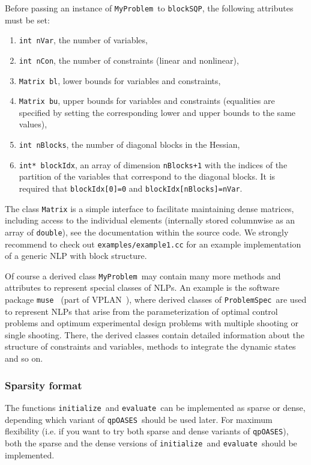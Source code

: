 \documentclass[	11pt,
				a4paper,
				abstract=true,
				twoside=true,
				bibliography=totoc, 
				headinclude=true,
				footinclude=false]{scrartcl}
\newcommand{\vplan}{VPLAN}
\newcommand{\muse}{\texttt{muse}}
\newcommand{\qpOASES}{\texttt{qpOASES}}
\newcommand{\blockSQP}{\texttt{blockSQP}}
\newcommand{\problem}{\texttt{ProblemSpec}}
\newcommand{\myproblem}{\texttt{MyProblem}}
\newcommand{\init}{\texttt{initialize}}
\newcommand{\evaluate}{\texttt{evaluate}}
\begin{document}
Before passing an instance of \myproblem\ to \blockSQP, the following attributes must be set:
\begin{enumerate}
\item \texttt{int nVar}, the number of variables,
\item \texttt{int nCon}, the number of constraints (linear and nonlinear),
\item \texttt{Matrix bl}, lower bounds for variables and constraints,
\item \texttt{Matrix bu}, upper bounds for variables and constraints (equalities are specified by setting the corresponding lower and upper bounds to the same values),
\item \texttt{int nBlocks}, the number of diagonal blocks in the Hessian,
\item \texttt{int* blockIdx}, an array of dimension \texttt{nBlocks+1} with the indices of the partition of the variables that correspond to the diagonal blocks. It is required that \texttt{blockIdx[0]=0} and \texttt{blockIdx[nBlocks]=nVar}.
\end{enumerate}
The class \texttt{Matrix} is a simple interface to facilitate maintaining dense matrices, including access to the individual elements (internally stored columnwise as an array of \texttt{double}), see the documentation within the source code. We strongly recommend to check out \texttt{examples/example1.cc} for an example implementation of a generic NLP with block structure.

Of course a derived class \myproblem\ may contain many more methods and attributes to represent special classes of NLPs. An example is the software package \muse~\cite{Janka2015} (part of \vplan~\cite{Koerkel2002}), where derived classes of \problem\ are used to represent NLPs that arise from the parameterization of optimal control problems and optimum experimental design problems with multiple shooting or single shooting. There, the derived classes contain detailed information about the structure of constraints and variables, methods to integrate the dynamic states and so on.

\subsubsection{Sparsity format}
The functions \init\ and \evaluate\ can be implemented as sparse or dense, depending which variant of \qpOASES\ should be used later. For maximum flexibility (i.e. if you want to try both sparse and dense variants of \qpOASES), both the sparse and the dense versions of \init\ and \evaluate\ should be implemented. 
\end{document}

